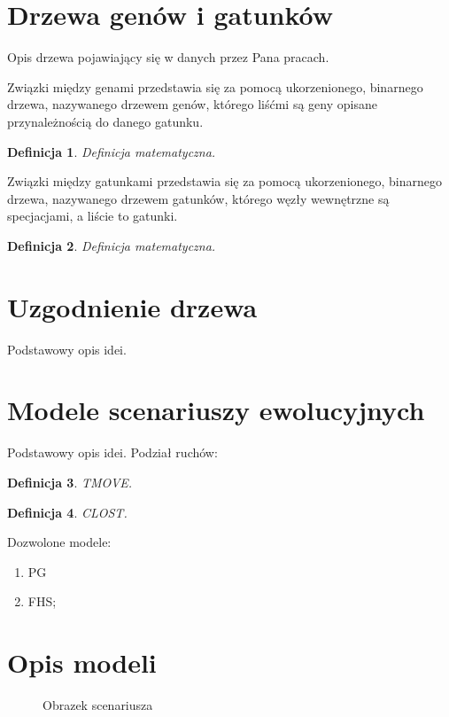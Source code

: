 \documentclass[licencjacka]{pracamgr}
\newtheorem{defi}{Definicja}[section]
\begin{document}
\section{Drzewa genów i gatunków}


Opis drzewa pojawiający się w danych przez Pana pracach.



Związki między genami przedstawia się za pomocą ukorzenionego, binarnego drzewa, nazywanego drzewem genów, którego liśćmi są geny opisane przynależnością do danego gatunku.
\begin{defi}\label{Drzewa genów}
  Definicja matematyczna.
\end{defi}

Związki między gatunkami przedstawia się za pomocą ukorzenionego, binarnego drzewa, nazywanego drzewem gatunków, którego węzły wewnętrzne są specjacjami, a liście to gatunki.
\begin{defi}\label{Drzewa gatunków}
  Definicja matematyczna.
\end{defi}

\section{Uzgodnienie drzewa}
Podstawowy opis idei.

\section{Modele scenariuszy ewolucyjnych}

Podstawowy opis idei. Podział ruchów:

\begin{defi}\label{TMOVE}
  TMOVE.
\end{defi}

\begin{defi}\label{CLOST}
  CLOST.
\end{defi}

Dozwolone modele:
\begin{enumerate}
\item PG
\item FHS;
\end{enumerate}

\section{Opis modeli}

\begin{figure}[tp]
  \centering
  \caption{Obrazek scenariusza}
\end{figure}
\end{document}

